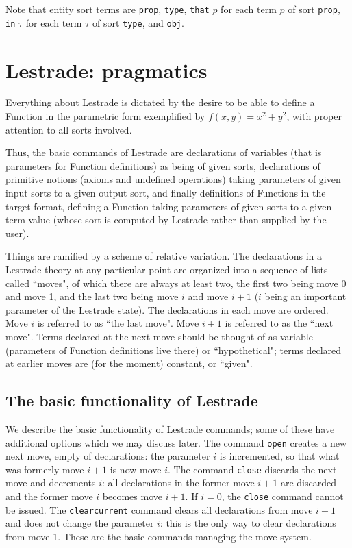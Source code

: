 \documentclass{article}
\begin{document}
Note that entity sort terms are {\tt prop}, {\tt type}, {\tt that} $p$ for each term $p$ of sort {\tt prop}, {\tt in} $\tau$ for each term $\tau$ of sort
{\tt type}, and {\tt obj}.

\newpage


\section{Lestrade:  pragmatics}

Everything about Lestrade is dictated by the desire to be able to define a Function in the parametric form exemplified by $f(x,y)=x^2+y^2$, with proper attention to all sorts involved.

Thus, the basic commands of Lestrade are declarations of variables (that is parameters for Function definitions) as being of given sorts, declarations of
primitive notions (axioms and undefined operations) taking parameters of given input sorts to a given output sort, and finally definitions of Functions in the target format, defining a Function taking parameters of given sorts to a given term value (whose sort is computed by Lestrade rather than supplied by the user).

Things are ramified by a scheme of relative variation.  The declarations in a Lestrade theory at any particular point are organized into a sequence of lists
called ``moves", of which there are always at least two, the first two being move 0 and move 1, and the last two being move $i$ and move $i+1$ ($i$ being an important parameter of the Lestrade state).  The declarations in each move are ordered.  Move $i$ is referred to as ``the last move".  Move $i+1$ is referred to as the ``next move".  Terms declared at the next move should be thought of as variable (parameters of Function definitions live there) or ``hypothetical";  terms declared at earlier moves are (for the moment) constant, or ``given".

\subsection{The basic functionality of Lestrade}

We describe the basic functionality of Lestrade commands;  some of these have additional options which we may discuss later.  The command {\tt open}
creates a new next move, empty of declarations:  the parameter $i$ is incremented, so that what was formerly move $i+1$ is now move $i$.  The command
{\tt close} discards the next move and decrements $i$:  all declarations in the former move $i+1$ are discarded and the former move $i$ becomes move $i+1$.  If $i=0$, the {\tt close} command cannot be issued.  The {\tt clearcurrent} command clears all declarations from move $i+1$ and does not change the parameter $i$:  this is the only way to clear declarations from move 1.  These are the basic commands managing the move system.
\end{document}
